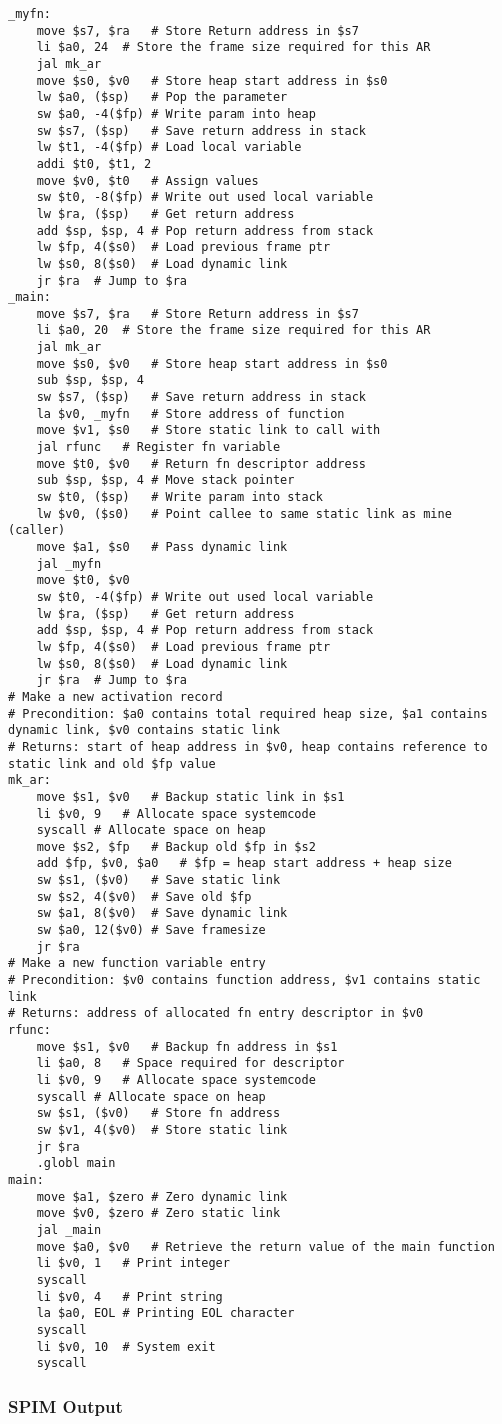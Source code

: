 \begin{lstlisting}[showstringspaces=false,breaklines=true,backgroundcolor=\color{light-gray}, captionpos=b]
_myfn:
	move $s7, $ra	# Store Return address in $s7
	li $a0, 24	# Store the frame size required for this AR
	jal mk_ar
	move $s0, $v0	# Store heap start address in $s0
	lw $a0, ($sp)	# Pop the parameter
	sw $a0, -4($fp)	# Write param into heap
	sw $s7, ($sp)	# Save return address in stack
	lw $t1, -4($fp)	# Load local variable
	addi $t0, $t1, 2
	move $v0, $t0	# Assign values
	sw $t0, -8($fp)	# Write out used local variable
	lw $ra, ($sp)	# Get return address
	add $sp, $sp, 4	# Pop return address from stack
	lw $fp, 4($s0)	# Load previous frame ptr
	lw $s0, 8($s0)	# Load dynamic link
	jr $ra	# Jump to $ra
_main:
	move $s7, $ra	# Store Return address in $s7
	li $a0, 20	# Store the frame size required for this AR
	jal mk_ar
	move $s0, $v0	# Store heap start address in $s0
	sub $sp, $sp, 4
	sw $s7, ($sp)	# Save return address in stack
	la $v0, _myfn	# Store address of function
	move $v1, $s0	# Store static link to call with
	jal rfunc	# Register fn variable
	move $t0, $v0	# Return fn descriptor address
	sub $sp, $sp, 4	# Move stack pointer
	sw $t0, ($sp)	# Write param into stack
	lw $v0, ($s0)	# Point callee to same static link as mine (caller)
	move $a1, $s0	# Pass dynamic link
	jal _myfn
	move $t0, $v0
	sw $t0, -4($fp)	# Write out used local variable
	lw $ra, ($sp)	# Get return address
	add $sp, $sp, 4	# Pop return address from stack
	lw $fp, 4($s0)	# Load previous frame ptr
	lw $s0, 8($s0)	# Load dynamic link
	jr $ra	# Jump to $ra
# Make a new activation record
# Precondition: $a0 contains total required heap size, $a1 contains dynamic link, $v0 contains static link
# Returns: start of heap address in $v0, heap contains reference to static link and old $fp value
mk_ar:
	move $s1, $v0	# Backup static link in $s1
	li $v0, 9	# Allocate space systemcode
	syscall	# Allocate space on heap
	move $s2, $fp	# Backup old $fp in $s2
	add $fp, $v0, $a0	# $fp = heap start address + heap size
	sw $s1, ($v0)	# Save static link
	sw $s2, 4($v0)	# Save old $fp
	sw $a1, 8($v0)	# Save dynamic link
	sw $a0, 12($v0)	# Save framesize
	jr $ra
# Make a new function variable entry
# Precondition: $v0 contains function address, $v1 contains static link
# Returns: address of allocated fn entry descriptor in $v0
rfunc:
	move $s1, $v0	# Backup fn address in $s1
	li $a0, 8	# Space required for descriptor
	li $v0, 9	# Allocate space systemcode
	syscall	# Allocate space on heap
	sw $s1, ($v0)	# Store fn address
	sw $v1, 4($v0)	# Store static link
	jr $ra
	.globl main
main:
	move $a1, $zero	# Zero dynamic link
	move $v0, $zero	# Zero static link
	jal _main
	move $a0, $v0	# Retrieve the return value of the main function
	li $v0, 1	# Print integer
	syscall
	li $v0, 4	# Print string
	la $a0, EOL	# Printing EOL character
	syscall
	li $v0, 10	# System exit
	syscall

\end{lstlisting}\subsubsection{SPIM Output}
